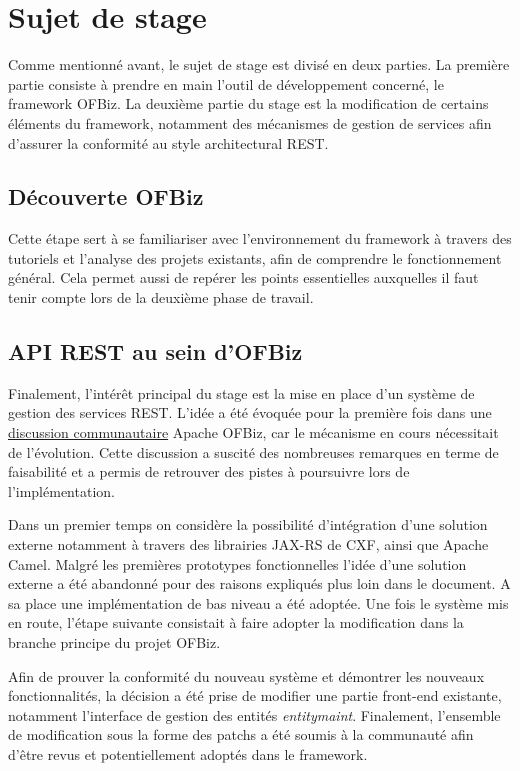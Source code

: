 \newpage
\section{Sujet de stage }
Comme mentionné avant, le sujet de stage est divisé en deux parties. La première partie consiste à prendre en main l'outil de développement concerné, le framework OFBiz. La deuxième partie du stage est la modification de certains éléments du framework, notamment des mécanismes de gestion de services afin d'assurer la conformité au style architectural REST.  

\subsection{Découverte OFBiz}
Cette étape sert à se familiariser avec l'environnement du framework à travers des tutoriels et l'analyse des projets existants, afin de comprendre le fonctionnement général. Cela permet aussi de repérer les points essentielles auxquelles il faut tenir compte lors de la deuxième phase de travail. 

\subsection{API REST au sein d'OFBiz}

Finalement, l'intérêt principal du stage est la mise en place d'un système de gestion des services REST. L'idée a été évoquée pour la première fois dans une \href{https://issues.apache.org/jira/browse/OFBIZ-4274}{discussion communautaire} Apache OFBiz, car le mécanisme en cours nécessitait de l'évolution. Cette discussion a suscité des nombreuses remarques en terme de faisabilité et a permis de retrouver des pistes à poursuivre lors de l'implémentation.  

Dans un premier temps on considère la possibilité d'intégration d'une solution externe notamment à travers des librairies JAX-RS de CXF, ainsi que Apache Camel. Malgré les premières prototypes fonctionnelles l'idée d'une solution externe a été abandonné pour des raisons expliqués plus loin dans le document. A sa place une implémentation de bas niveau a été adoptée. Une fois le système mis en route, l'étape suivante consistait à faire adopter la modification dans la branche principe du projet OFBiz. 

Afin de prouver la conformité du nouveau système et démontrer les nouveaux fonctionnalités, la décision a été prise de modifier une partie front-end existante, notamment l'interface de gestion des entités \emph{entitymaint}. Finalement, l'ensemble de modification sous la forme des patchs a été soumis à la communauté afin d'être revus et potentiellement adoptés dans le framework. 









